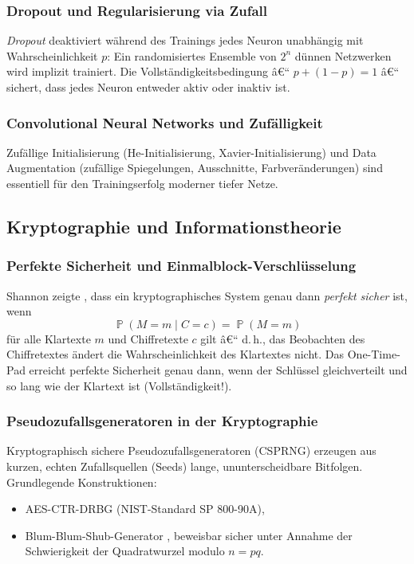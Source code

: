 ﻿\documentclass[12pt,a4paper]{article}
\theoremstyle{definition}
\theoremstyle{plain}
\theoremstyle{remark}
\DeclareMathOperator{\Prob}{\mathbb{P}}
\begin{document}
\subsubsection{Dropout und Regularisierung via Zufall}
\emph{Dropout} \cite{srivastava2014dropout} deaktiviert während des Trainings
jedes Neuron unabhängig mit Wahrscheinlichkeit $p$: Ein randomisiertes
Ensemble von $2^n$ dünnen Netzwerken wird implizit trainiert. Die
Vollständigkeitsbedingung â€“ $p + (1-p) = 1$ â€“ sichert, dass jedes Neuron
entweder aktiv oder inaktiv ist.

\subsubsection{Convolutional Neural Networks und Zufälligkeit}
Zufällige Initialisierung (He-Initialisierung, Xavier-Initialisierung)
und Data Augmentation (zufällige Spiegelungen, Ausschnitte, Farbveränderungen)
sind essentiell für den Trainingserfolg moderner tiefer Netze.

\subsection{Kryptographie und Informationstheorie}

\subsubsection{Perfekte Sicherheit und Einmalblock-Verschlüsselung}
Shannon zeigte \cite{shannon1949communication}, dass ein kryptographisches
System genau dann \emph{perfekt sicher} ist, wenn
\[
  \Prob(M = m \mid C = c) = \Prob(M = m)
\]
für alle Klartexte $m$ und Chiffretexte $c$ gilt â€“ d.\,h., das Beobachten des
Chiffretextes ändert die Wahrscheinlichkeit des Klartextes nicht. Das
One-Time-Pad erreicht perfekte Sicherheit genau dann, wenn der Schlüssel
gleichverteilt und so lang wie der Klartext ist (Vollständigkeit!).

\subsubsection{Pseudozufallsgeneratoren in der Kryptographie}
Kryptographisch sichere Pseudozufallsgeneratoren (CSPRNG) erzeugen aus
kurzen, echten Zufallsquellen (Seeds) lange, ununterscheidbare Bitfolgen.
Grundlegende Konstruktionen:
\begin{itemize}
  \item AES-CTR-DRBG (NIST-Standard SP 800-90A),
  \item Blum-Blum-Shub-Generator \cite{blum1986simple}, beweisbar sicher
    unter Annahme der Schwierigkeit der Quadratwurzel modulo $n=pq$.
\end{itemize}
\end{document}
